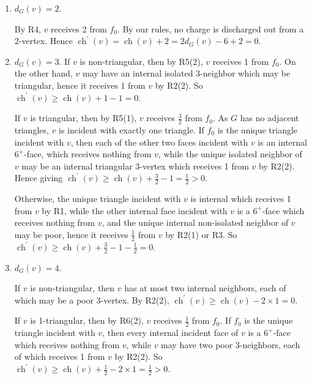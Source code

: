 \documentclass{article}
\begin{document}
\begin{enumerate}[label=(\arabic*)]
    \item 
$d_G(v)=2$.

 By R4, $v$ receives 2 from $f_0$. 
By our rules, no charge is discharged out from a 2-vertex. 
Hence $\operatorname{ch}^{\prime}(v)=\operatorname{ch}(v)+2 = 2d_G(v)-6 + 2 = 0$.
    
  \item $d_G(v)=3$.
  If  $v$ is non-triangular, then by R5(2), $v$ receives 1 from $f_0$. 
     On the other hand, $v$ may have an internal isolated 3-neighbor which may be triangular, 
     hence it receives 1 from $v$ by R2(2). 
     So $\operatorname{ch}^{\prime}(v)\ge \operatorname{ch}(v)+1 - 1 = 0$.
    
    If   $v$ is triangular, then by R5(1), $v$ receives $\frac{3}{2}$ from $f_0$.
    As $G$ has no adjacent triangles, $v$ is incident with exactly one triangle. 
    If $f_0$ is the unique triangle incident with $v$, then each of the other two faces incident with $v$ is an internal $6^+$-face, which receives nothing from $v$, while the unique isolated neighbor of $v$ 
    may be an internal triangular 3-vertex which receives 1 from $v$ by R2(2). 
    Hence giving $\operatorname{ch}^{\prime}(v)\ge \operatorname{ch}(v)+\frac{3}{2}-1=\frac{1}{2}>0$. 
    
    Otherwise, the unique triangle incident with $v$ is internal which receives 1 from $v$ by R1, 
    while the other internal face incident with $v$ is a $6^+$-face which receives nothing from $v$, 
    and the unique internal non-isolated neighbor of $v$ may be poor, hence it receives $\frac{1}{2}$ from $v$ by R2(1) or R3. So $\operatorname{ch}^{\prime}(v)\ge \operatorname{ch}(v)+\frac{3}{2}-1-\frac{1}{2}=0$.
    
   \item  $d_G(v)=4$.
   
   If $v$ is non-triangular, then  $v$ has at most two internal neighbors, 
    each of which may be a poor 3-vertex. By R2(2), $\operatorname{ch}^{\prime}(v)\ge  \operatorname{ch}(v)-2\times1 = 0$.

    
     If $v$ is 1-triangular, then by  R6(2), $v$ receives $\frac{1}{2}$ from $f_0$. 
     If $f_0$ is the unique triangle incident with $v$, then every internal incident face of $v$ 
     is a $6^+$-face which receives nothing from $v$, while $v$ may have two poor 3-neighbors, 
     each of which receives 1 from $v$ by R2(2). So
     $\operatorname{ch}^{\prime}(v)\ge \operatorname{ch}(v)+\frac{1}{2}-2\times1=\frac{1}{2}>0$. 
     

\end{enumerate}
\end{document}
